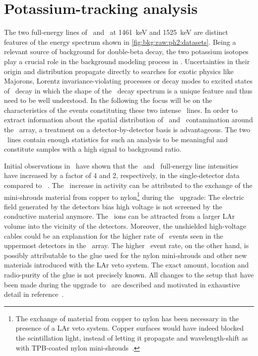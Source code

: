 \begin{table}
\centering
  \caption{%
    Fit results of the \a\ events background analysis for the
    \enrBEGeII\ and \enrCoaxII\ data sets. Values are given in counts in the
    full pdf range from 40~keV to 8000~keV.
  }\label{tab:bkg:raw:ph2:amodel:results}
  
\end{table}

\section{Potassium-tracking analysis}%
\label{sec:bkg:raw:ph2:kmodel}

The two full-energy lines of \kvn\ and \kvz\ at 1461~keV and 1525~keV are distinct
features of the energy spectrum shown in \cref{fig:bkg:raw:ph2:datasets}. Being a relevant
source of background for double-beta decay, the two potassium isotopes play a crucial role
in the background modeling process in \gerda. Uncertainties in their origin and
distribution propagate directly to searches for exotic physics like Majorons, Lorentz
invariance-violating processes or decay modes to excited states of \nnbb\ decay in which
the shape of the \nnbb\ decay spectrum is a unique feature and thus need to be well
understood. In the following the focus will be on the characteristics of the events
constituting these two intense \g\ lines. In order to extract information about the
spatial distribution of \kvn\ and \kvz\ contamination around the \gerda\ array, a
treatment on a detector-by-detector basis is advantageous. The two \g\ lines contain
enough statistics for such an analysis to be meaningful and constitute samples with a high
signal to background ratio.

Initial observations in \phasetwo\ have shown that the \kvn\ and \kvz\ full-energy line
intensities have increased by a factor of 4 and 2, respectively, in the single-detector
data compared to \phaseone~\cite{DAndrea2017}. The \kvz\ increase in activity can be
attributed to the exchange of the mini-shrouds material from copper to nylon\footnote{%
  The exchange of material from copper to nylon has been necessary in the presence of a
  LAr veto system. Copper surfaces would have indeed blocked the scintillation light,
  instead of letting it propagate and wavelength-shift as with TPB-coated nylon
  mini-shrouds~\cite{Lubashevskiy2017}.
} during the \phasetwo\ upgrade: The electric field generated by the detectors bias high
voltage is not screened by the conductive material anymore. The \kvz\ ions can be
attracted from a larger LAr volume into the vicinity of the detectors.  Moreover, the
unshielded high-voltage cables could be an explanation for the higher rate of \kvz\ events
seen in the uppermost detectors in the \gerda\ array. The higher \kvn\ event rate, on the
other hand, is possibly attributable to the glue used for the nylon mini-shrouds and other
new materials introduced with the LAr veto system. The exact amount, location and
radio-purity of the glue is not precisely known.  All changes to the setup that have been
made during the upgrade to \phasetwo\ are described and motivated in exhaustive detail in
reference~\cite{Agostini2018a}.

